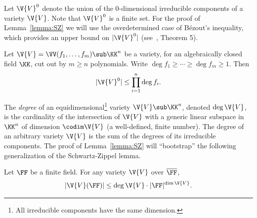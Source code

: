 Let $\V{V}^0$ denote the union of the $0$-dimensional irreducible components of a variety $\V{V}$. Note that $\V{V}^0$ is a finite set.
For the proof of Lemma~\ref{lemma:SZ} we will use the overdetermined case of B\'{e}zout's inequality, which provides an upper bound on $|\V{V}^0|$ (see~\cite{Tao11}, Theorem 5).

\begin{fact}\label{fact:bezout-over}
Let $\V{V} = \VV(f_1,\ldots,f_m) \sub \KK^n$ be a variety, for an algebraically closed field $\KK$, 
cut out by $m \ge n$ polynomials. 
Write $\deg f_1 \ge \cdots \ge \deg f_m \ge 1$. 
Then 
$$|\V{V}^0| \le \prod_{i=1}^n \deg f_i.$$
\end{fact}

The \emph{degree} of an equidimensional\footnote{All irreducible components have the same dimension.} variety $\V{V} \sub \KK^n$, denoted $\deg\V{V}$, is the cardinality of the intersection of $\V{V}$ with a generic linear subspace in $\KK^n$ of dimension $\codim\V{V}$ (a well-defined, finite number).
The degree of an arbitrary variety $\V{V}$ is the sum of the degrees of its irreducible components.
The proof of Lemma~\ref{lemma:SZ} will ``bootstrap'' the following generalization of the Schwartz-Zippel lemma. 

\begin{fact}\label{fact:SZ}
Let $\FF$ be a finite field.
For any variety $\V{V}$ over $\overline{\FF}$,
$$|\V{V}(\FF)| \le \deg\V{V}\cdot|\FF|^{\dim\V{V}}.$$
\end{fact}


